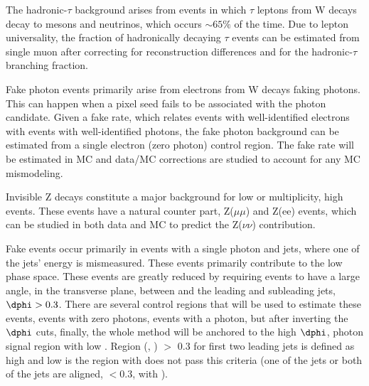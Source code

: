 The hadronic-$\tau$ background arises from events in which $\tau$ leptons from 
W decays decay to mesons and neutrinos, which occurs $\sim 65\%$ of the time.  
Due to lepton universality, the fraction of hadronically decaying $\tau$ events 
can be estimated from single muon after correcting for reconstruction differences
and for the hadronic-$\tau$ branching fraction.  

Fake photon events primarily arise from electrons from W decays faking 
photons.  This can happen when a pixel seed fails to be associated with
the photon candidate.  Given a fake rate, which relates events with well-identified
electrons with events with well-identified photons, the fake photon background
can be estimated from a single electron (zero photon) control region.  The 
fake rate will be estimated in MC and data/MC corrections are studied to 
account for any MC mismodeling.

Invisible Z decays constitute a major background for low \nb or \nj multiplicity, high 
\ptmiss events.  These events have a natural counter part, Z($\mu\mu$) and Z(ee)
events, which can be studied in both data and MC to predict the Z($\nu\nu$) 
contribution.

Fake \ptmiss events occur primarily in events with a single photon and jets, 
where one of the jets' energy is mismeasured.  These events primarily
contribute to the low \ptmiss phase space.  These events are greatly reduced
by requiring events to have a large angle, in the transverse plane, between
\ptmiss and the leading and subleading jets, $\dphi>0.3$.  There are several control 
regions that will be used to estimate these events, events with zero photons, 
events with a photon, but after inverting the $\dphi$ cuts, 
finally, the whole method will be anchored to the high $\dphi$, photon
signal region with low \ptmiss. Region \dphi(\ptvecmiss, \ptvecjet) $>$ 0.3 for first two leading jets is defined as
high \dphi and low \dphi is the region with does not pass this criteria (one of the jets or both of the jets are aligned, \dphi$<$0.3, with \ptmiss).




